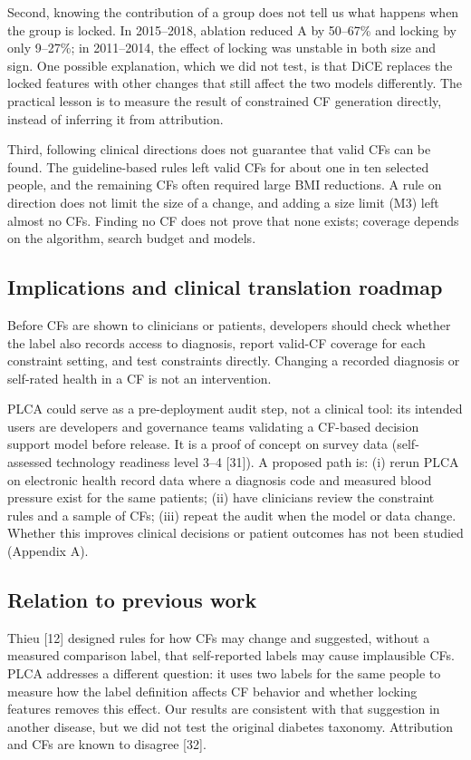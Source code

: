 \documentclass[final,5p,times,twocolumn]{elsarticle}
\begin{document}
Second, knowing the contribution of a group does not tell us what
happens when the group is locked. In 2015--2018, ablation reduced
\textbar A\textbar{} by 50--67\% and locking by only 9--27\%; in
2011--2014, the effect of locking was unstable in both size and sign.
One possible explanation, which we did not test, is that DiCE replaces
the locked features with other changes that still affect the two models
differently. The practical lesson is to measure the result of
constrained CF generation directly, instead of inferring it from
attribution.

Third, following clinical directions does not guarantee that valid CFs
can be found. The guideline-based rules left valid CFs for about one in
ten selected people, and the remaining CFs often required large BMI
reductions. A rule on direction does not limit the size of a change, and
adding a size limit (M3) left almost no CFs. Finding no CF does not
prove that none exists; coverage depends on the algorithm, search budget
and models.

\subsection{Implications and clinical translation roadmap}

Before CFs are shown to clinicians or patients, developers should check
whether the label also records access to diagnosis, report valid-CF
coverage for each constraint setting, and test constraints directly.
Changing a recorded diagnosis or self-rated health in a CF is not an
intervention.

PLCA could serve as a pre-deployment audit step, not a clinical tool:
its intended users are developers and governance teams validating a
CF-based decision support model before release. It is a proof of concept
on survey data (self-assessed technology readiness level 3--4 {[}31{]}).
A proposed path is: (i) rerun PLCA on electronic health record data
where a diagnosis code and measured blood pressure exist for the same
patients; (ii) have clinicians review the constraint rules and a sample
of CFs; (iii) repeat the audit when the model or data change. Whether
this improves clinical decisions or patient outcomes has not been
studied (Appendix A).

\subsection{Relation to previous work}

Thieu {[}12{]} designed rules for how CFs may change and suggested,
without a measured comparison label, that self-reported labels may cause
implausible CFs. PLCA addresses a different question: it uses two labels
for the same people to measure how the label definition affects CF
behavior and whether locking features removes this effect. Our results
are consistent with that suggestion in another disease, but we did not
test the original diabetes taxonomy. Attribution and CFs are known to
disagree {[}32{]}.
\end{document}
